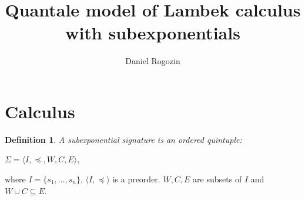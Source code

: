 \documentclass[a4paper]{article}
\date{}
\author[1,2]{Daniel Rogozin}
\affil[1]{Lomonosov Moscow State University}
\affil[2]{Serokell O\"{U}}
\title{Quantale model of Lambek calculus with subexponentials}
\newtheorem{defin}{Definition}
\begin{document}
\maketitle

\section{Calculus}

\begin{defin} A subexponential signature is an ordered quintuple:

  $\Sigma = \langle I, \preceq, W, C, E \rangle$,
\end{defin}

where $I = \{ s_1, \dots, s_n\}$, $\langle I, \preceq \rangle$ is a preorder.
$W, C, E$ are subsets of $I$ and $W \cup C \subseteq E$.
\end{document}
